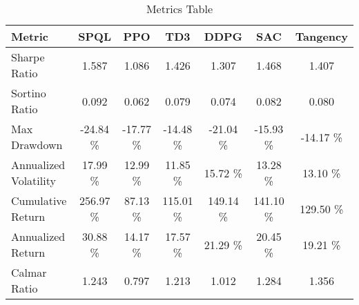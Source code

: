 \begin{table}[H]
\centering
\begin{tabular}{lcccccc}
\toprule
Metric & SPQL & PPO & TD3 & DDPG & SAC & Tangency \\
\midrule
Sharpe Ratio & 1.587 & 1.086 & 1.426 & 1.307 & 1.468 & 1.407 \\
Sortino Ratio & 0.092 & 0.062 & 0.079 & 0.074 & 0.082 & 0.080 \\
Max Drawdown & -24.84 \% & -17.77 \% & -14.48 \% & -21.04 \% & -15.93 \% & -14.17 \% \\
Annualized Volatility & 17.99 \% & 12.99 \% & 11.85 \% & 15.72 \% & 13.28 \% & 13.10 \% \\
Cumulative Return & 256.97 \% & 87.13 \% & 115.01 \% & 149.14 \% & 141.10 \% & 129.50 \% \\
Annualized Return & 30.88 \% & 14.17 \% & 17.57 \% & 21.29 \% & 20.45 \% & 19.21 \% \\
Calmar Ratio & 1.243 & 0.797 & 1.213 & 1.012 & 1.284 & 1.356 \\
\bottomrule
\end{tabular}
\caption{Metrics Table}
\label{tab:metrics_table}
\end{table}